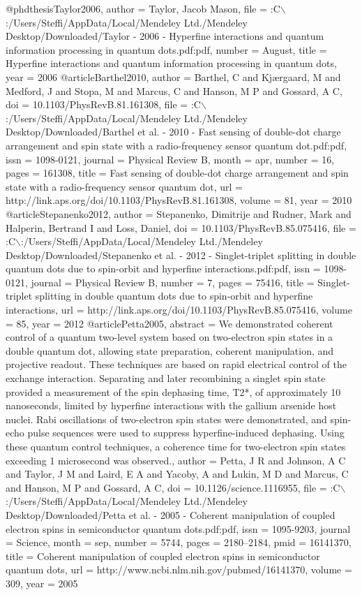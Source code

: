 @phdthesis{Taylor2006,
author = {Taylor, Jacob Mason},
file = {:C$\backslash$:/Users/Steffi/AppData/Local/Mendeley Ltd./Mendeley Desktop/Downloaded/Taylor - 2006 - Hyperfine interactions and quantum information processing in quantum dots.pdf:pdf},
number = {August},
title = {{Hyperfine interactions and quantum information processing in quantum dots}},
year = {2006}
}
@article{Barthel2010,
author = {Barthel, C and Kj{\ae}rgaard, M and Medford, J and Stopa, M and Marcus, C and Hanson, M P and Gossard, A C},
doi = {10.1103/PhysRevB.81.161308},
file = {:C$\backslash$:/Users/Steffi/AppData/Local/Mendeley Ltd./Mendeley Desktop/Downloaded/Barthel et al. - 2010 - Fast sensing of double-dot charge arrangement and spin state with a radio-frequency sensor quantum dot.pdf:pdf},
issn = {1098-0121},
journal = {Physical Review B},
month = {apr},
number = {16},
pages = {161308},
title = {{Fast sensing of double-dot charge arrangement and spin state with a radio-frequency sensor quantum dot}},
url = {http://link.aps.org/doi/10.1103/PhysRevB.81.161308},
volume = {81},
year = {2010}
}
@article{Stepanenko2012,
author = {Stepanenko, Dimitrije and Rudner, Mark and Halperin, Bertrand I and Loss, Daniel},
doi = {10.1103/PhysRevB.85.075416},
file = {:C$\backslash$:/Users/Steffi/AppData/Local/Mendeley Ltd./Mendeley Desktop/Downloaded/Stepanenko et al. - 2012 - Singlet-triplet splitting in double quantum dots due to spin-orbit and hyperfine interactions.pdf:pdf},
issn = {1098-0121},
journal = {Physical Review B},
number = {7},
pages = {75416},
title = {{Singlet-triplet splitting in double quantum dots due to spin-orbit and hyperfine interactions}},
url = {http://link.aps.org/doi/10.1103/PhysRevB.85.075416},
volume = {85},
year = {2012}
}
@article{Petta2005,
abstract = {We demonstrated coherent control of a quantum two-level system based on two-electron spin states in a double quantum dot, allowing state preparation, coherent manipulation, and projective readout. These techniques are based on rapid electrical control of the exchange interaction. Separating and later recombining a singlet spin state provided a measurement of the spin dephasing time, T2*, of approximately 10 nanoseconds, limited by hyperfine interactions with the gallium arsenide host nuclei. Rabi oscillations of two-electron spin states were demonstrated, and spin-echo pulse sequences were used to suppress hyperfine-induced dephasing. Using these quantum control techniques, a coherence time for two-electron spin states exceeding 1 microsecond was observed.},
author = {Petta, J R and Johnson, A C and Taylor, J M and Laird, E A and Yacoby, A and Lukin, M D and Marcus, C and Hanson, M P and Gossard, A C},
doi = {10.1126/science.1116955},
file = {:C$\backslash$:/Users/Steffi/AppData/Local/Mendeley Ltd./Mendeley Desktop/Downloaded/Petta et al. - 2005 - Coherent manipulation of coupled electron spins in semiconductor quantum dots.pdf:pdf},
issn = {1095-9203},
journal = {Science},
month = {sep},
number = {5744},
pages = {2180--2184},
pmid = {16141370},
title = {{Coherent manipulation of coupled electron spins in semiconductor quantum dots}},
url = {http://www.ncbi.nlm.nih.gov/pubmed/16141370},
volume = {309},
year = {2005}
}
